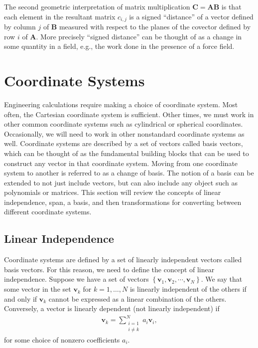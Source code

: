 The second geometric interpretation of matrix multiplication $\mathbf{C} = \mathbf{AB}$ is that each element in the resultant matrix $c_{i,j}$ is a signed ``distance'' of a vector defined by column $j$ of $\mathbf{B}$ measured with respect to the planes of the covector defined by row $i$ of $\mathbf{A}$. More precisely ``signed distance'' can be thought of as a change in some quantity in a field, e.g., the work done in the presence of a force field.


\section{Coordinate Systems}

Engineering calculations require making a choice of coordinate system. Most often, the Cartesian coordinate system is sufficient. Other times, we must work in other common coordinate systems such as cylindrical or spherical coordinates. Occasionally, we will need to work in other nonstandard coordinate systems as well. Coordinate systems are described by a set of vectors called basis vectors, which can be thought of as the fundamental building blocks that can be used to construct any vector in that coordinate system. Moving from one coordinate system to another is referred to as a change of basis. The notion of a basis can be extended to not just include vectors, but can also include any object such as polynomials or matrices. This section will review the concepts of linear independence, span, a basis, and then transformations for converting between different coordinate systems.

\subsection{Linear Independence}

Coordinate systems are defined by a set of linearly independent vectors called basis vectors. For this reason, we need to define the concept of linear independence. Suppose we have a set of vectors $\left\{ \mathbf{v}_1, \mathbf{v}_2, \cdots , \mathbf{v}_N \right\}$. We say that some vector in the set $\mathbf{v}_k$ for $k = 1, \ldots , N$ is linearly independent of the others if and only if $\mathbf{v}_k$ cannot be expressed as a linear combination of the others. Conversely, a vector is linearly dependent (not linearly independent) if
\begin{align}
  \mathbf{v}_k = \sum_{\substack{i = 1\\ i\ne k}}^N a_i \mathbf{v}_i ,
\end{align}
for some choice of nonzero coefficients $a_i$.

